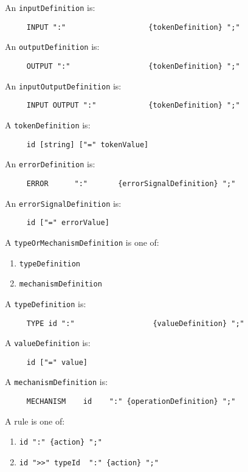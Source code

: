 An {\tt inputDefinition} is:
\begin{verbatim}
     INPUT ":"                   {tokenDefinition} ";"
\end{verbatim}


An {\tt outputDefinition} is:
\begin{verbatim}
     OUTPUT ":"                  {tokenDefinition} ";"
\end{verbatim}


An {\tt inputOutputDefinition} is:
\begin{verbatim}
     INPUT OUTPUT ":"            {tokenDefinition} ";"
\end{verbatim}


A {\tt tokenDefinition} is:
\begin{verbatim}
     id [string] ["=" tokenValue]
\end{verbatim}

An {\tt errorDefinition} is:
\begin{verbatim}
     ERROR      ":"       {errorSignalDefinition} ";"
\end{verbatim}

An {\tt errorSignalDefinition} is:
\begin{verbatim}
     id ["=" errorValue]
\end{verbatim}

A {\tt typeOrMechanismDefinition} is one of:
\begin{enumerate}
\item {\tt typeDefinition}
\item {\tt mechanismDefinition}
\end{enumerate}


A {\tt typeDefinition} is:
\begin{verbatim}
     TYPE id ":"                  {valueDefinition} ";"
\end{verbatim}

A {\tt valueDefinition} is:
\begin{verbatim}
     id ["=" value]
\end{verbatim}


A {\tt mechanismDefinition} is:
\begin{verbatim}
     MECHANISM    id    ":" {operationDefinition} ";"
\end{verbatim}


A rule is one of:
\begin{enumerate}
\item 
\begin{verbatim}
id ":" {action} ";"
\end{verbatim}
\item 
\begin{verbatim}
id ">>" typeId  ":" {action} ";"
\end{verbatim}
\end{enumerate}


